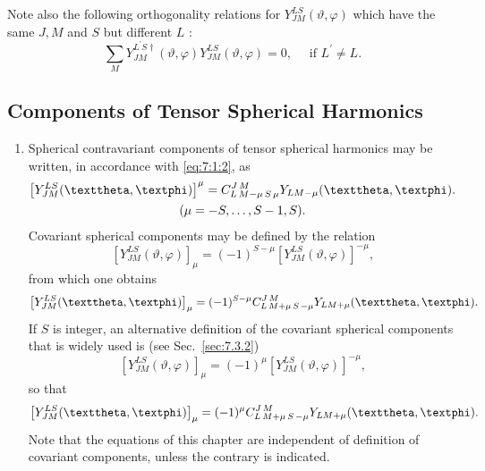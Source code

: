 Note also the following orthogonality relations for $Y_{J M}^{L S}(\vartheta, \varphi)$ which have the same $J, M$ and $S$ but different $L$ :
\begin{equation}
\sum_{M} Y_{J M}^{L^{\prime} S\dagger}(\vartheta, \varphi)   Y_{J M}^{L S}(\vartheta, \varphi)=0, \quad \text { if } L^{\prime} \neq L. \label{eq:7:1:4}
\end{equation}
\subsection{Components of Tensor Spherical Harmonics}\label{sec:7.1.2}
\begin{enumerate}[label=(\alph*)]
\item Spherical contravariant components of tensor spherical harmonics may be written, in accordance with \eqref{eq:7:1:2}, as
\begin{gather}
{\left[Y_{J M}^{L S}(\vartheta, \varphi)\right]^{\mu}=\clebsch{L}{M-\mu}{S}{\mu}{J}{M} Y_{L M-\mu}(\vartheta, \varphi)}.  \label{eq:7:1:5}\\
(\mu=-S, \ldots, S-1, S). \notag
\end{gather}
Covariant spherical components may be defined by the relation
\begin{equation}
\left[Y_{J M}^{L S}(\vartheta, \varphi)\right]_{\mu}=(-1)^{S-\mu}\left[Y_{J M}^{L S}(\vartheta, \varphi)\right]^{-\mu}, \label{eq:7:1:6}
\end{equation}
from which one obtains
\begin{equation}
\left[Y_{J M}^{L S}(\vartheta, \varphi)\right]_{\mu}=(-1)^{S-\mu} \clebsch{L}{M+\mu}{S}{-\mu}{J}{M} Y_{L M+\mu}(\vartheta, \varphi). \label{eq:7:1:7}
\end{equation}
If $S$ is integer, an alternative definition of the covariant spherical components that is widely used is (see Sec.~\ref{sec:7.3.2})
\begin{equation}
\left[Y_{J M}^{L S}(\vartheta, \varphi)\right]_{\mu}=(-1)^{\mu}\left[Y_{J M}^{L S}(\vartheta, \varphi)\right]^{-\mu}, \label{eq:7:1:8}
\end{equation}
so that
\begin{equation}
\left[Y_{J M}^{L S}(\vartheta, \varphi)\right]_{\mu}=(-1)^{\mu} \clebsch{L}{M+\mu}{S}{-\mu}{J}{M} Y_{L M+\mu}(\vartheta, \varphi). \label{eq:7:1:9}
\end{equation}
Note that the equations of this chapter are independent of definition of covariant components, unless the contrary is indicated.

\end{enumerate}

